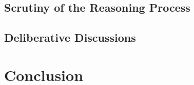 \documentclass[journal,10pt]{IEEEtran}
\begin{document}
\subsection{Scrutiny of the Reasoning Process}

\subsection{Deliberative Discussions}

\section{Conclusion}




\appendices

\label{Chart}
\clearpage

\label{Easy}

\label{Hard}
\end{document}
